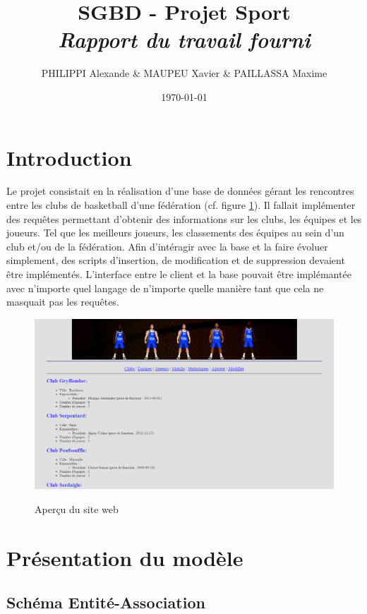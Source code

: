 \documentclass[a4paper»,8pt,french,fleqn]{report}
\title{\textbf{SGBD - Projet Sport }\\\textit{Rapport du travail fourni}}
\author{PHILIPPI Alexande \& MAUPEU Xavier \& PAILLASSA Maxime}
\date{\today}
\begin{document}
\maketitle

\newpage

\tableofcontents

\newpage

\chapter*{Introduction}

Le projet consistait en la réalisation d'une base de données gérant les rencontres entre les clubs de basketball d'une fédération (cf. figure \ref{fig:website}). Il fallait implémenter des requêtes permettant d'obtenir des informations sur les clubs, les équipes et les joueurs. Tel que les meilleurs joueurs, les classements des équipes au sein d'un club et/ou de la fédération. Afin d'intéragir avec la base et la faire évoluer simplement, des scripts d'insertion, de modification et de suppression devaient être implémentés. L'interface entre le client et la base pouvait être implémantée avec n'importe quel langage de n'importe quelle manière tant que cela ne masquait pas les requêtes.

\begin{figure}[h]
  \centering
    \includegraphics[scale=0.45]{site.png}
    \label{fig:website}
    \caption{Aperçu du site web}
\end{figure}

\chapter{Présentation du modèle}

\section{Schéma Entité-Association}
\end{document}
